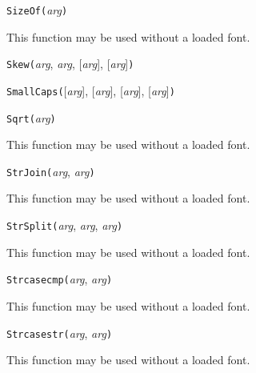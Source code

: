 

\texttt{SizeOf(}\textit{arg}\texttt{)}

This function may be used without a loaded font.



\texttt{Skew(}\textit{arg}, \textit{arg}, [\textit{arg}], [\textit{arg}]\texttt{)}



\texttt{SmallCaps(}[\textit{arg}], [\textit{arg}], [\textit{arg}], [\textit{arg}]\texttt{)}



\texttt{Sqrt(}\textit{arg}\texttt{)}

This function may be used without a loaded font.



\texttt{StrJoin(}\textit{arg}, \textit{arg}\texttt{)}

This function may be used without a loaded font.



\texttt{StrSplit(}\textit{arg}, \textit{arg}, \textit{arg}\texttt{)}

This function may be used without a loaded font.



\texttt{Strcasecmp(}\textit{arg}, \textit{arg}\texttt{)}

This function may be used without a loaded font.



\texttt{Strcasestr(}\textit{arg}, \textit{arg}\texttt{)}

This function may be used without a loaded font.




